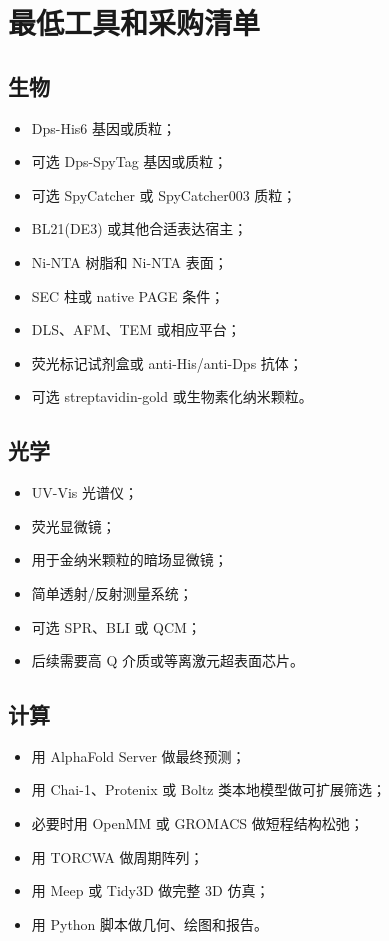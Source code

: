 \documentclass[11pt]{ctexart}
\newcommand{\af}{AlphaFold}
\begin{document}
\section{最低工具和采购清单}

\subsection{生物}

\begin{itemize}
\item Dps-His6 基因或质粒；
\item 可选 Dps-SpyTag 基因或质粒；
\item 可选 SpyCatcher 或 SpyCatcher003 质粒；
\item BL21(DE3) 或其他合适表达宿主；
\item Ni-NTA 树脂和 Ni-NTA 表面；
\item SEC 柱或 native PAGE 条件；
\item DLS、AFM、TEM 或相应平台；
\item 荧光标记试剂盒或 anti-His/anti-Dps 抗体；
\item 可选 streptavidin-gold 或生物素化纳米颗粒。
\end{itemize}

\subsection{光学}

\begin{itemize}
\item UV-Vis 光谱仪；
\item 荧光显微镜；
\item 用于金纳米颗粒的暗场显微镜；
\item 简单透射/反射测量系统；
\item 可选 SPR、BLI 或 QCM；
\item 后续需要高 Q 介质或等离激元超表面芯片。
\end{itemize}

\subsection{计算}

\begin{itemize}
\item 用 \af{} Server 做最终预测；
\item 用 Chai-1、Protenix 或 Boltz 类本地模型做可扩展筛选；
\item 必要时用 OpenMM 或 GROMACS 做短程结构松弛；
\item 用 TORCWA 做周期阵列；
\item 用 Meep 或 Tidy3D 做完整 3D 仿真；
\item 用 Python 脚本做几何、绘图和报告。
\end{itemize}
\end{document}
